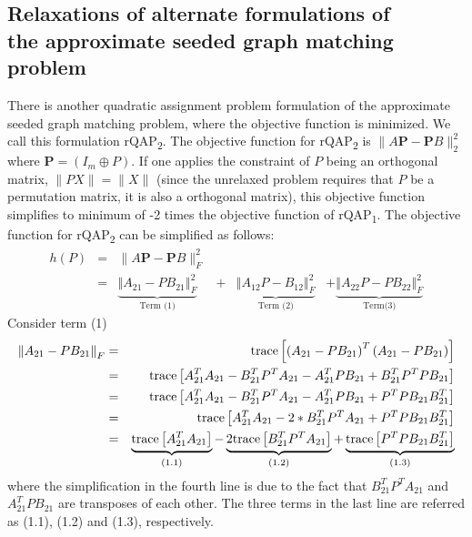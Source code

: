 \documentclass[12pt,oneside,final]{thesis}
\begin{document}
\subsection{Relaxations of alternate formulations of \\ the approximate seeded graph matching problem \label{subsec:rqap2}}
There is another quadratic assignment problem formulation of  the approximate seeded graph matching problem, where the objective function is  minimized. We call this formulation rQAP\textsubscript{2}.
The objective function for rQAP\textsubscript{2} is
$\|A\bm{P}-\bm{P}B\|_2^2$ where $\bm{P}=(I_m\oplus P)$. If one applies the constraint of $P$ being an orthogonal matrix, \ie $\|PX\|=\|X\|$ (since the unrelaxed problem requires that $P$ be a permutation matrix, it is also a orthogonal matrix), this objective function simplifies to minimum of -2 times the objective function of  rQAP\textsubscript{1}. The objective function for  rQAP\textsubscript{2} can be simplified as follows:
\begin{align*}
h(P) & = & \lVert A\bm{P}-\bm{P}B\rVert _{F}^2\\
 & = & \underbrace{{\left\Vert A_{21}-PB_{21}\right\Vert _{F}^2}}_{\textrm{Term (1)}} & + & \underbrace{{\left\Vert A_{12}P-B_{12}\right\Vert _{F}^2}}_{\textrm{Term (2)}} & + \underbrace{{\left\Vert A_{22}P-PB_{22}\right\Vert _{F}^2}}_{\textrm{Term(3)} } 
\end{align*}
Consider term (1)
\begin{align*}
\left\Vert A_{21}-PB_{21}\right\Vert _{F} & = & \textup{trace}\left[\left(A_{21}-PB_{21}\right)^{T}\left(A_{21}-PB_{21}\right)\right]\\
 & = & \textup{trace}\left[A_{21}^{T}A_{21}-B_{21}^{T}P^{T}A_{21}-A_{21}^{T}PB_{21}+B_{21}^{T}P^{T}PB_{21}\right]\\
 & = & \textup{trace}\left[A_{21}^{T}A_{21}-B_{21}^{T}P^{T}A_{21}-A_{21}^{T}PB_{21}+P^{T}PB_{21}B_{21}^{T}\right]\\
 & = & \textup{trace}\left[A_{21}^{T}A_{21}-2*B_{21}^{T}P^{T}A_{21}+P^{T}PB_{21}B_{21}^{T}\right] \\
 & = & \underbrace{\textup{trace}\left[A_{21}^{T}A_{21}\right]}_{(1.1)}
 -\underbrace{2\textup{trace}\left[ B_{21}^{T}P^{T}A_{21}\right]}_{(1.2)}
 +\underbrace{\textup{trace}\left[P^{T}PB_{21}B_{21}^{T}\right]}_{(1.3)}
\end{align*}
where the simplification in the fourth line is due to the fact that $B_{21}^{T}P^{T}A_{21}$ and $A_{21}^{T}PB_{21}$
 are transposes of each other.
The three terms  in the last line are referred
as (1.1), (1.2) and (1.3), respectively.
\end{document}
